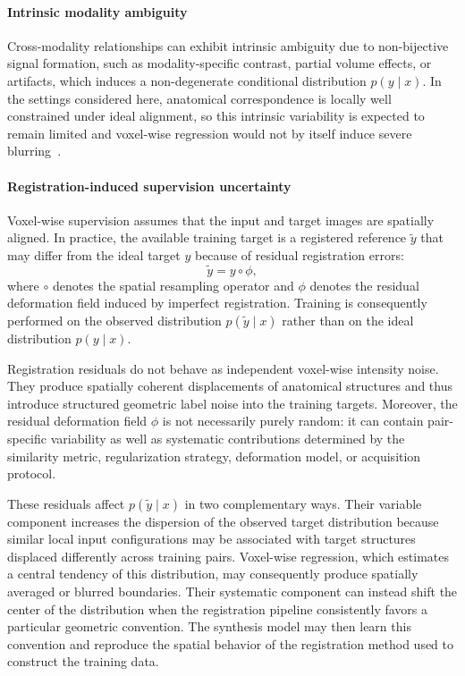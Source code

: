 \documentclass[lettersize,journal]{IEEEtran}
\begin{document}
\paragraph{Intrinsic modality ambiguity}
Cross-modality relationships can exhibit intrinsic ambiguity due to non-bijective signal formation, such as modality-specific contrast, partial volume effects, or artifacts, which induces a non-degenerate conditional distribution $p(y \mid x)$. In the settings considered here, anatomical correspondence is locally well constrained under ideal alignment, so this intrinsic variability is expected to remain limited and voxel-wise regression would not by itself induce severe blurring~\cite{rassmann2026regression}.

\paragraph{Registration-induced supervision uncertainty}
Voxel-wise supervision assumes that the input and target images are spatially aligned. In practice, the available training target is a registered reference $\tilde{y}$ that may differ from the ideal target $y$ because of residual registration errors:
\begin{equation}
    \tilde{y} = y \circ \phi,
\end{equation}
where $\circ$ denotes the spatial resampling operator and $\phi$ denotes the residual deformation field induced by imperfect registration. Training is consequently performed on the observed distribution $p(\tilde{y}\mid x)$ rather than on the ideal distribution $p(y\mid x)$.

Registration residuals do not behave as independent voxel-wise intensity noise. They produce spatially coherent displacements of anatomical structures and thus introduce structured geometric label noise into the training targets. Moreover, the residual deformation field $\phi$ is not necessarily purely random: it can contain pair-specific variability as well as systematic contributions determined by the similarity metric, regularization strategy, deformation model, or acquisition protocol.

These residuals affect $p(\tilde{y}\mid x)$ in two complementary ways. Their variable component increases the dispersion of the observed target distribution because similar local input configurations may be associated with target structures displaced differently across training pairs. Voxel-wise regression, which estimates a central tendency of this distribution, may consequently produce spatially averaged or blurred boundaries. Their systematic component can instead shift the center of the distribution when the registration pipeline consistently favors a particular geometric convention. The synthesis model may then learn this convention and reproduce the spatial behavior of the registration method used to construct the training data.
\end{document}
